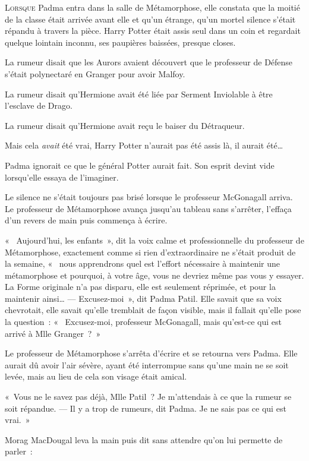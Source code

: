 
\lettrine{L}{orsque}  Padma entra dans la salle de Métamorphose, elle constata que la moitié de la classe était arrivée avant elle et qu'un étrange, qu'un mortel silence s'était répandu à travers la pièce.
Harry Potter était assis seul dans un coin et regardait quelque lointain inconnu, ses paupières baissées, presque closes.

La rumeur disait que les Aurors avaient découvert que le professeur de Défense s'était polynectaré en Granger pour avoir Malfoy.

La rumeur disait qu'Hermione avait été liée par Serment Inviolable à être l'esclave de Drago.

La rumeur disait qu'Hermione avait reçu le baiser du Détraqueur.

Mais cela \emph{avait} été vrai, Harry Potter n'aurait pas été assis là, il aurait été…

Padma ignorait ce que le général Potter aurait fait.
Son esprit devint vide lorsqu'elle essaya de l'imaginer.

Le silence ne s'était toujours pas brisé lorsque le professeur McGonagall arriva.
Le professeur de Métamorphose avança jusqu'au tableau sans s'arrêter, l'effaça d'un revers de main puis commença à écrire.

«~ Aujourd'hui, les enfants~», dit la voix calme et professionnelle du professeur de Métamorphose, exactement comme si rien d'extraordinaire ne s'était produit de la semaine, «~ nous apprendrons quel est l'effort nécessaire à maintenir une métamorphose et pourquoi, à votre âge, vous ne devriez même pas vous y essayer.
La Forme originale n'a pas disparu, elle est seulement réprimée, et pour la maintenir ainsi…
---  Excusez-moi~», dit Padma Patil.
Elle savait que sa voix chevrotait, elle savait qu'elle tremblait de façon visible, mais il fallait qu'elle pose la question~: «~ Excusez-moi, professeur McGonagall, mais qu'est-ce qui est arrivé à Mlle Granger~?~»

Le professeur de Métamorphose s'arrêta d'écrire et se retourna vers Padma.
Elle aurait dû avoir l'air sévère, ayant été interrompue sans qu'une main ne se soit levée, mais au lieu de cela son visage était amical.

«~Vous ne le savez pas déjà, Mlle Patil~?
Je m'attendais à ce que la rumeur se soit répandue.
---  Il y a trop de rumeurs, dit Padma.
Je ne sais pas ce qui est vrai.~»

Morag MacDougal leva la main puis dit sans attendre qu'on lui permette de parler~:

